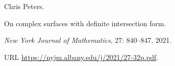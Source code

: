Chris Peters.

\newblock On complex surfaces with definite intersection form.

\newblock \emph{New York Journal of Mathematics}, 27: 840--847, 2021.

\newblock URL \url{https://nyjm.albany.edu/j/2021/27-32p.pdf}.

